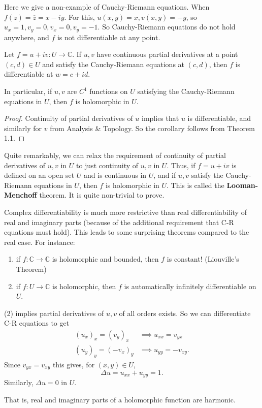 \leavevmode
\begin{example}
    Here we give a non-example of Cauchy-Riemann equations. When \(f(z) = \overline{z} = x - iy\). For this, \(u(x,y) = x, v(x,y) = -y\), so \(u_x = 1, v_y = 0, v_x = 0, v_y = -1\). So Cauchy-Riemann equations do not hold anywhere, and \(f\) is not differentiable at any point.
\end{example}
\begin{corollary}
    Let \(f = u + iv: U \to \mathbb{C}\). If \(u, v\) have continuous partial derivatives at a point \((c,d) \in U\) and satisfy the Cauchy-Riemann equations at \((c,d)\), then \(f\) is differentiable at \(w = c + id\).

    In particular, if \(u, v\) are \(C^1\) functions on \(U\) satisfying the Cauchy-Riemann equations in \(U\), then \(f\) is holomorphic in \(U\). 
\end{corollary}
\begin{proof}
    Continuity of partial derivatives of \(u\) implies that \(u\) is differentiable, and similarly for \(v\) from Analysis \& Topology. So the corollary follows from Theorem 1.1.
\end{proof}
\begin{note}
    Quite remarkably, we can relax the requirement of continuity of partial derivatives of \(u,v\) in \(U\) to just continuity of \(u, v\) in \(U\). Thus, if \(f = u + iv\) is defined on an open set \(U\) and is continuous in \(U\), and if \(u, v\) satisfy the Cauchy-Riemann equations in \(U\), then \(f\) is holomorphic in \(U\). This is called the \textbf{Looman-Menchoff} theorem. It is quite non-trivial to prove.
\end{note}
\begin{remark}
    Complex differentiability is much more restrictive than real differentiability of real and imaginary parts (because of the additional requirement that C-R equations must hold). This leads to some surprising theorems compared to the real case. For instance:
    \begin{enumerate}
        \item if \(f: \mathbb{C} \to \mathbb{C}\) is holomorphic and bounded, then \(f\) is constant! (Liouville's Theorem)
        \item if \(f: U\to \mathbb{C}\) is holomorphic, then \( f\) is automatically infinitely differentiable on \(U\).
    \end{enumerate}
\end{remark}
\begin{note}
    (2) implies partial derivatives of \(u, v\) of all orders exists. So we can differentiate C-R equations to get
    \begin{align*}
        (u_x)_x = (v_y)_x &\implies u_{xx} = v_{yx}\\
        (u_y)_y = (-v_x)_y &\implies u_{yy} = -v_{xy}.
    \end{align*}
    Since \(v_{yx} = v_{xy}\) this gives, for \((x,y) \in U\),
    \[
        \Delta u = u_{xx} + u_{yy} = 1.
    \]
    Similarly, \(\Delta u = 0\) in \(U\).

    That is, real and imaginary parts of a holomorphic function are harmonic.
\end{note}
